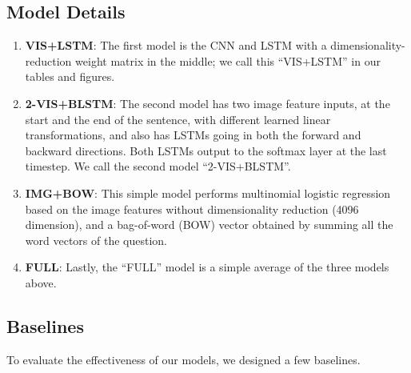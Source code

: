 \documentclass{article} %
\renewcommand{\#}[1]{\textbf{#1}}
\begin{document}
\subsection{Model Details}

\begin{enumerate}[leftmargin=*]

\item \#{VIS+LSTM}: The first model is the CNN and LSTM with a dimensionality-
reduction weight matrix in the middle; we call this ``VIS+LSTM'' in our tables
and figures.

\item \#{2-VIS+BLSTM}: The second model has two image feature inputs, at the
start and the end of the sentence, with different learned linear
transformations, and also has LSTMs going in both the forward and backward
directions. Both LSTMs output to the softmax layer at the last timestep. We
call the second model ``2-VIS+BLSTM''.

\item \#{IMG+BOW}: This simple model performs multinomial logistic regression
based on the image features without dimensionality reduction (4096 dimension),
and a bag-of-word (BOW) vector obtained by summing all the word vectors of the
question.

\item \#{FULL}: Lastly, the ``FULL'' model is a simple average of the three
models above.

\end{enumerate}

\subsection{Baselines}

To evaluate the effectiveness of our models, we designed a few baselines.
\end{document}
